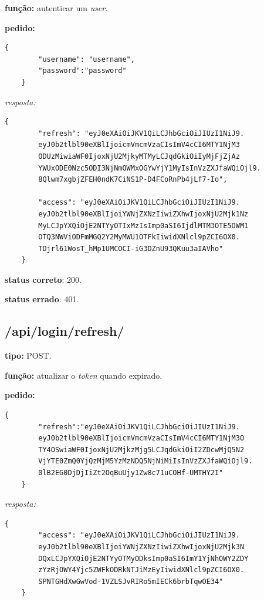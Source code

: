 \documentclass[11pt,a4paper]{report}
\begin{document}
\textbf{função:} autenticar um \emph{user}.


\textbf{pedido:}

\begin{lstlisting}[style = code]
    {
        "username": "username",
        "password":"password"
    }
\end{lstlisting}

\emph{resposta:}

\begin{lstlisting}[style = code]
    {
        "refresh": "eyJ0eXAiOiJKV1QiLCJhbGciOiJIUzI1NiJ9.
        eyJ0b2tlbl90eXBlIjoicmVmcmVzaCIsImV4cCI6MTY1NjM3
        ODUzMiwiaWF0IjoxNjU2MjkyMTMyLCJqdGkiOiIyMjFjZjAz
        YWUxODE0Nzc5ODI3NjNmOWMxOGYwYjY1MyIsInVzZXJfaWQiOjl9.
        8Qlwm7xgbjZFEH0ndK7CiNS1P-D4FCoRnPb4jLf7-Io",
    
        "access": "eyJ0eXAiOiJKV1QiLCJhbGciOiJIUzI1NiJ9.
        eyJ0b2tlbl90eXBlIjoiYWNjZXNzIiwiZXhwIjoxNjU2Mjk1Nz
        MyLCJpYXQiOjE2NTYyOTIxMzIsImp0aSI6IjdlMTM3OTE5OWM1
        OTQ3NWViODFmMGQ2Y2MyMWU1OTFkIiwidXNlcl9pZCI6OX0.
        TDjrl61WosT_hMp1UMCOCI-iG3DZnU93QKuu3aIAVho"
    }

\end{lstlisting}

\textbf{status correto}: 200.

\textbf{status errado}: 401.

\newpage

\subsection{/api/login/refresh/}

\textbf{tipo:} POST.

\textbf{função:} atualizar o \emph{token} quando expirado.

\textbf{pedido:}

\begin{lstlisting}[style = code]
    {
        "refresh":"eyJ0eXAiOiJKV1QiLCJhbGciOiJIUzI1NiJ9.
        eyJ0b2tlbl90eXBlIjoicmVmcmVzaCIsImV4cCI6MTY1NjM3O
        TY4OSwiaWF0IjoxNjU2MjkzMjg5LCJqdGkiOiI2ZDcwMjQ5N2
        VjYTE0ZmQ0YjQzMjM5YzMzNDQ5NjNiMiIsInVzZXJfaWQiOjl9.
        0lB2EG0DjDjIiZt2OqBuUjy1Zw8c71uCOHf-UMTHY2I"  
    }
\end{lstlisting}

\emph{resposta:}

\begin{lstlisting}[style = code]
    {
        "access": "eyJ0eXAiOiJKV1QiLCJhbGciOiJIUzI1NiJ9.
        eyJ0b2tlbl90eXBlIjoiYWNjZXNzIiwiZXhwIjoxNjU2Mjk3N
        DQxLCJpYXQiOjE2NTYyOTMyODksImp0aSI6ImY1YjNhOWY2ZDY
        zYzRjOWY4Yjc5ZWFkODRkNTJiMzEyIiwidXNlcl9pZCI6OX0.
        SPNTGHdXwGwVod-1VZLSJvRIRo5mIECk6brbTqwOE34"
    }
\end{lstlisting}
\end{document}
